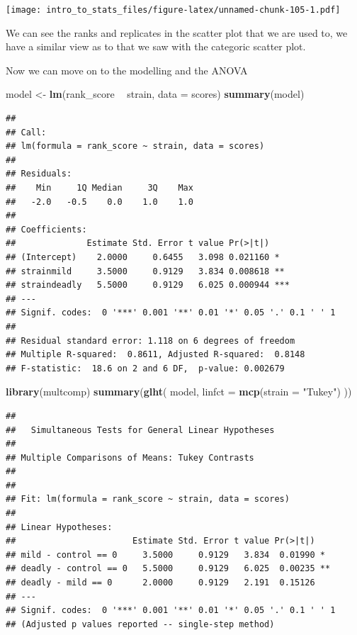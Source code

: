 \documentclass[
]{book}
\newenvironment{Shaded}{\begin{snugshade}}{\end{snugshade}}
\newcommand{\DataTypeTok}[1]{\textcolor[rgb]{0.13,0.29,0.53}{#1}}
\newcommand{\KeywordTok}[1]{\textcolor[rgb]{0.13,0.29,0.53}{\textbf{#1}}}
\newcommand{\NormalTok}[1]{#1}
\newcommand{\OperatorTok}[1]{\textcolor[rgb]{0.81,0.36,0.00}{\textbf{#1}}}
\newcommand{\StringTok}[1]{\textcolor[rgb]{0.31,0.60,0.02}{#1}}
\begin{document}
\texttt{[image: intro\_to\_stats\_files/figure-latex/unnamed-chunk-105-1.pdf]}

We can see the ranks and replicates in the scatter plot that we are used to, we have a similar view as to that we saw with the categoric scatter plot.

Now we can move on to the modelling and the ANOVA

\begin{Shaded}
\begin{Highlighting}[]
\NormalTok{model <-}\StringTok{ }\KeywordTok{lm}\NormalTok{(rank_score }\OperatorTok{~}\StringTok{ }\NormalTok{strain, }\DataTypeTok{data =}\NormalTok{ scores)}
\KeywordTok{summary}\NormalTok{(model)}
\end{Highlighting}
\end{Shaded}

\begin{verbatim}
## 
## Call:
## lm(formula = rank_score ~ strain, data = scores)
## 
## Residuals:
##    Min     1Q Median     3Q    Max 
##   -2.0   -0.5    0.0    1.0    1.0 
## 
## Coefficients:
##              Estimate Std. Error t value Pr(>|t|)    
## (Intercept)    2.0000     0.6455   3.098 0.021160 *  
## strainmild     3.5000     0.9129   3.834 0.008618 ** 
## straindeadly   5.5000     0.9129   6.025 0.000944 ***
## ---
## Signif. codes:  0 '***' 0.001 '**' 0.01 '*' 0.05 '.' 0.1 ' ' 1
## 
## Residual standard error: 1.118 on 6 degrees of freedom
## Multiple R-squared:  0.8611,	Adjusted R-squared:  0.8148 
## F-statistic:  18.6 on 2 and 6 DF,  p-value: 0.002679
\end{verbatim}

\begin{Shaded}
\begin{Highlighting}[]
\KeywordTok{library}\NormalTok{(multcomp)}
\KeywordTok{summary}\NormalTok{(}\KeywordTok{glht}\NormalTok{(}
\NormalTok{  model, }\DataTypeTok{linfct =} \KeywordTok{mcp}\NormalTok{(}\DataTypeTok{strain =} \StringTok{"Tukey"}\NormalTok{)}
\NormalTok{))}
\end{Highlighting}
\end{Shaded}

\begin{verbatim}
## 
## 	 Simultaneous Tests for General Linear Hypotheses
## 
## Multiple Comparisons of Means: Tukey Contrasts
## 
## 
## Fit: lm(formula = rank_score ~ strain, data = scores)
## 
## Linear Hypotheses:
##                       Estimate Std. Error t value Pr(>|t|)   
## mild - control == 0     3.5000     0.9129   3.834  0.01990 * 
## deadly - control == 0   5.5000     0.9129   6.025  0.00235 **
## deadly - mild == 0      2.0000     0.9129   2.191  0.15126   
## ---
## Signif. codes:  0 '***' 0.001 '**' 0.01 '*' 0.05 '.' 0.1 ' ' 1
## (Adjusted p values reported -- single-step method)
\end{verbatim}
\end{document}
